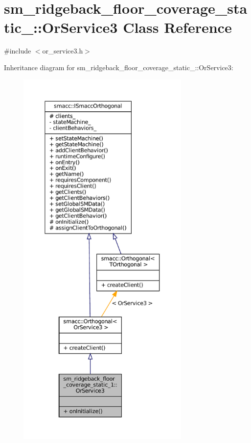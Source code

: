 \hypertarget{classsm__ridgeback__floor__coverage__static__1_1_1OrService3}{}\section{sm\+\_\+ridgeback\+\_\+floor\+\_\+coverage\+\_\+static\+\_\+:\+:Or\+Service3 Class Reference}
\label{classsm__ridgeback__floor__coverage__static__1_1_1OrService3}


{\ttfamily \#include $<$or\+\_\+service3.\+h$>$}



Inheritance diagram for sm\+\_\+ridgeback\+\_\+floor\+\_\+coverage\+\_\+static\+\_\+:\+:Or\+Service3\+:
\nopagebreak
\begin{figure}[H]
\begin{center}
\leavevmode
\includegraphics[height=550pt]{classsm__ridgeback__floor__coverage__static__1_1_1OrService3__inherit__graph}
\end{center}
\end{figure}


